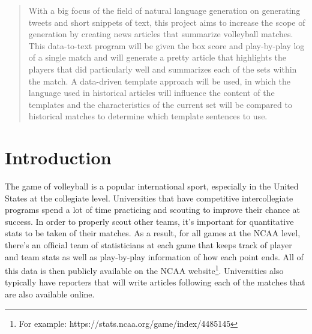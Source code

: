 \documentclass{article}
\begin{document}
 


\begin{abstract} 
With a big focus of the field of natural language generation on generating tweets and short snippets of text, this project aims to increase the scope of generation by creating news articles that summarize volleyball matches. This data-to-text program will be given the box score and play-by-play log of a single match and will generate a pretty article that highlights the players that did particularly well and summarizes each of the sets within the match. A data-driven template approach will be used, in which the language used in historical articles will influence the content of the templates and the characteristics of the current set will be compared to historical matches to determine which template sentences to use. 
\end{abstract} 

\section{Introduction}

The game of volleyball is a popular international sport, especially in the United States at the collegiate level. Universities that have competitive intercollegiate programs spend a lot of time practicing and scouting to improve their chance at success. In order to properly scout other teams, it's important for quantitative stats to be taken of their matches. As a result, for all games at the NCAA level, there's an official team of statisticians at each game that keeps track of player and team stats as well as play-by-play information of how each point ends. All of this data is then publicly available on the NCAA website\footnote{For example: https://stats.ncaa.org/game/index/4485145}. Universities also typically have reporters that will write articles following each of the matches that are also available online. 
\end{document}
